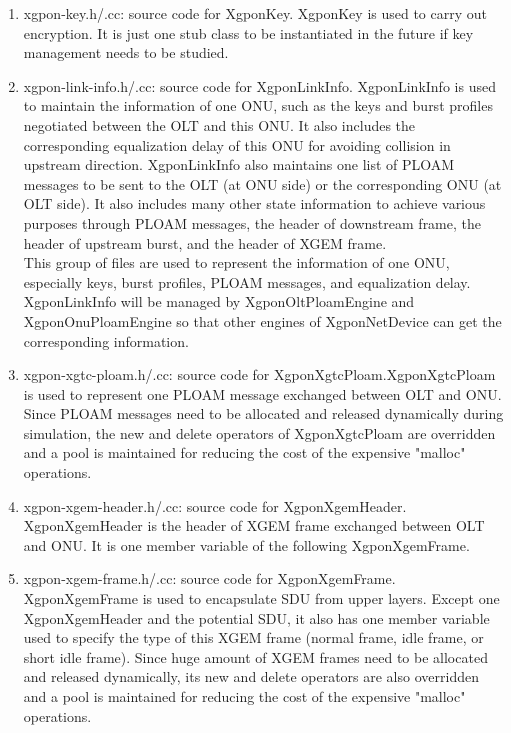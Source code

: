 \begin{enumerate}
 \item xgpon-key.h/.cc: source code for {\color{red} XgponKey}. XgponKey is used to carry out encryption. 
It is just one stub class to be instantiated in the future if key management needs to be studied.

 \item xgpon-link-info.h/.cc: source code for {\color{red} XgponLinkInfo}. 
XgponLinkInfo is used to maintain the information of one ONU, such as the keys and 
burst profiles negotiated between the OLT and this ONU. It also includes 
the corresponding equalization delay of this ONU for avoiding collision in upstream direction. 
XgponLinkInfo also maintains one list of PLOAM messages to be sent to the OLT (at ONU side) 
or the corresponding ONU (at OLT side). It also includes many other state information 
to achieve various purposes through PLOAM messages, the header of downstream frame, 
the header of upstream burst, and the header of XGEM frame.
\\
{\color{blue} This group of files are used to represent the information of one ONU, 
especially keys, burst profiles, PLOAM messages, and equalization delay. XgponLinkInfo 
will be managed by XgponOltPloamEngine and XgponOnuPloamEngine so that other engines 
of XgponNetDevice can get the corresponding information.}
\vspace{0.3in}




 \item xgpon-xgtc-ploam.h/.cc: source code for {\color{red} XgponXgtcPloam}.XgponXgtcPloam is used to
represent one PLOAM message exchanged between OLT and ONU. Since PLOAM messages need to 
be allocated and released dynamically during simulation, the new and delete operators of XgponXgtcPloam 
are overridden and a pool is maintained for reducing the cost of the expensive "malloc" operations.

 \item xgpon-xgem-header.h/.cc: source code for {\color{red} XgponXgemHeader}. XgponXgemHeader is 
the header of XGEM frame exchanged between OLT and ONU. It is one member variable of the following
XgponXgemFrame.

 \item xgpon-xgem-frame.h/.cc: source code for {\color{red} XgponXgemFrame}. 
XgponXgemFrame is used to encapsulate SDU from upper layers. Except one XgponXgemHeader 
and the potential SDU, it also has one member variable used to specify the type of this XGEM frame 
(normal frame, idle frame, or short idle frame). Since huge amount of XGEM frames
need to be allocated and released dynamically, its new and delete
operators are also overridden and a pool is maintained for
reducing the cost of the expensive "malloc" operations.
\vspace{0.1in}


\end{enumerate}

